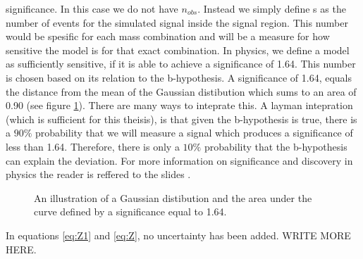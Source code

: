 significance. In this case we do not have $n_{obs}$. Instead we simply define s as the number of events for the simulated signal 
inside the signal region. This number would be spesific for each mass combination and will be a measure for how sensitive 
the model is for that exact combination. In physics, we define a model as sufficiently sensitive, if it is able to achieve a 
significance of 1.64. This number is chosen based on its relation to the b-hypothesis. A significance of 1.64, equals the 
distance from the mean of the Gaussian distibution which sums to an area of 0.90 (see figure \ref{fig:ConfInt}). There are many ways to inteprate this. A layman 
intepration (which is sufficient for this theisis), is that given the b-hypothesis is true, there is a $90\%$ probability that we will 
measure a signal which produces a significance of less than 1.64. Therefore, there is only a $10\%$ probability that the b-hypothesis
can explain the deviation. For more information on significance and discovery in physics the reader is reffered to the slides \cite{magnar}.
\begin{figure}
    \centering
    \caption{An illustration of a Gaussian distibution and the area under the curve defined by a significance equal to 1.64.}
    \label{fig:ConfInt}
\end{figure}
In equations \ref{eq:Z1} and \ref{eq:Z}, no uncertainty has been added. WRITE MORE HERE.
